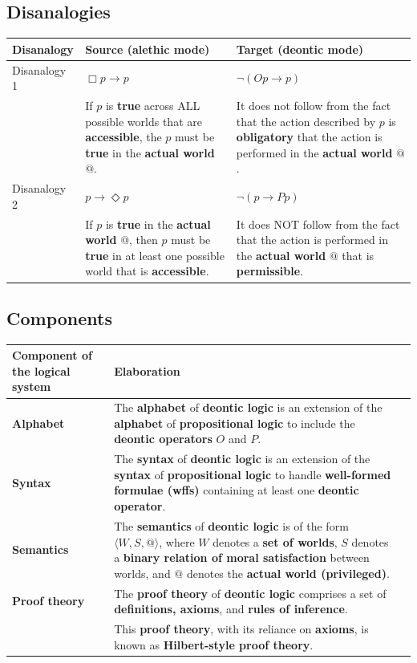 \documentclass[11pt]{article}
\begin{document}
\subsection{Disanalogies}
\label{sec:org09fb1cf}
\begin{center}
\begin{tabularx}{\textwidth}{|X|X|X|}
\hline
Disanalogy & Source (alethic mode) & Target (deontic mode)\\
\hline
Disanalogy 1 & \(\Box p \rightarrow p\) & \(\neg (Op \rightarrow p)\)\\
 & If \(p\) is \textbf{true} across ALL possible worlds that are \textbf{accessible}, the \(p\) must be \textbf{true} in the \textbf{actual world} \(@\). & It does not follow from the fact that the action described by \(p\) is \textbf{obligatory} that the action is performed in the \textbf{actual world} \(@\).\\
\hline
Disanalogy 2 & \(p \rightarrow \Diamond p\) & \(\neg (p \rightarrow Pp)\)\\
 & If \(p\) is \textbf{true} in the \textbf{actual world} \(@\), then \(p\) must be \textbf{true} in at least one possible world that is \textbf{accessible}. & It does NOT follow from the fact that the action is performed in the \textbf{actual world} \(@\) that is \textbf{permissible}.\\
\hline
\end{tabularx}
\end{center}
\subsection{Components}
\label{sec:orgfa32901}
\begin{center}
\begin{tabularx}{\textwidth}{|X|X|X|}
\hline
Component of the logical system & Elaboration\\
\hline
\textbf{Alphabet} & The \textbf{alphabet} of \textbf{deontic logic} is an extension of the \textbf{alphabet} of \textbf{propositional logic} to include the \textbf{deontic operators} \(O\) and \(P\).\\
\hline
\textbf{Syntax} & The \textbf{syntax} of \textbf{deontic logic} is an extension of the \textbf{syntax} of \textbf{propositional logic} to handle \textbf{well-formed formulae (wffs)} containing at least one \textbf{deontic operator}.\\
\hline
\textbf{Semantics} & The \textbf{semantics} of \textbf{deontic logic} is of the form \(\langle W, S, @ \rangle\), where \(W\) denotes a \textbf{set of worlds}, \(S\) denotes a \textbf{binary relation of moral satisfaction} between worlds, and \(@\) denotes the \textbf{actual world (privileged)}.\\
\hline
\textbf{Proof theory} & The \textbf{proof theory} of \textbf{deontic logic} comprises a set of \textbf{definitions, axioms}, and \textbf{rules of inference}.\\
 & This \textbf{proof theory}, with its reliance on \textbf{axioms}, is known as \textbf{Hilbert-style proof theory}.\\
\hline
\end{tabularx}
\end{center}
\end{document}
